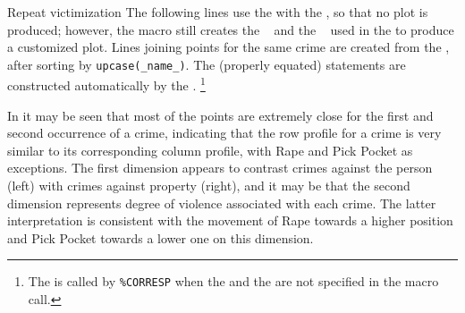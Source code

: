 \begin{Example}[victims2]{Repeat victimization}
The following lines use the  with the ,
so that no plot is produced;  however, the macro still creates the \ODS\  and the \ADS\  used in the 
to produce a customized plot.
Lines joining points for the same crime are created from the 
\Dset, after sorting by \verb|upcase(_name_)|.
The (properly equated)  statements are constructed automatically by the
.%
\footnote{The  is called by \texttt{\%CORRESP}
when the  and the
 are not specified in the macro call.}


In  it may be seen that most of the points are
extremely close for the first and second occurrence of a crime,  indicating
that the row profile for a crime is very similar to its corresponding column
profile, with Rape and Pick Pocket as exceptions.
The first dimension appears to contrast crimes against the person (left) with
crimes against property (right), and it may be that the second dimension
represents degree of violence associated with each crime.
The latter interpretation is consistent with the movement of Rape towards
a higher position and Pick Pocket towards a lower one on this dimension.
\end{Example}
